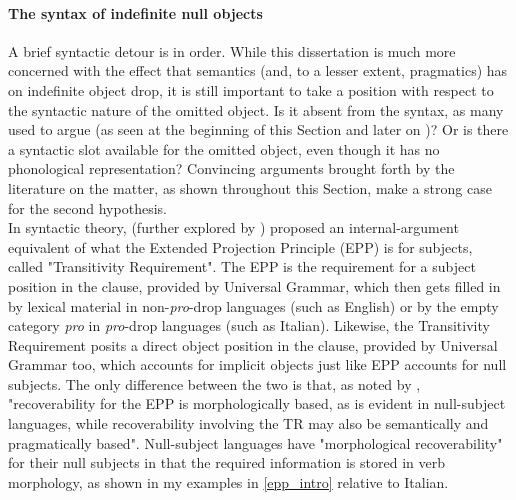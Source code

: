 \paragraph{The syntax of indefinite null objects} A brief syntactic detour is in order. While this dissertation is much more concerned with the effect that semantics (and, to a lesser extent, pragmatics) has on indefinite object drop, it is still important to take a position with respect to the syntactic nature of the omitted object. Is it absent from the syntax, as many used to argue (as seen at the beginning of this Section and later on )? Or is there a syntactic slot available for the omitted object, even though it has no phonological representation? Convincing arguments brought forth by the literature on the matter, as shown throughout this Section, make a strong case for the second hypothesis.\\
In syntactic theory, \textcite{roberge2002transitivity} (further explored by \textcite{CumminsRoberge2004, CumminsRoberge2005}) proposed an internal-argument equivalent of what the Extended Projection Principle (EPP) \parencite{chomsky1982epp} is for subjects, called "Transitivity Requirement". The EPP is the requirement for a subject position in the clause, provided by Universal Grammar, which then gets filled in by lexical material in non-\textit{pro}-drop languages (such as English) or by the empty category \textit{pro} in \textit{pro}-drop languages (such as Italian). Likewise, the Transitivity Requirement posits a direct object position in the clause, provided by Universal Grammar too, which accounts for implicit objects just like EPP accounts for null subjects. The only difference between the two is that, as noted by \textcite{CumminsRoberge2004}, "recoverability for the EPP is morphologically based, as is evident in null-subject languages, while recoverability involving the TR may also be semantically and pragmatically based". Null-subject languages have "morphological recoverability" for their null subjects in that the required information is stored in verb morphology, as shown in my examples in \ref{epp_intro} relative to Italian.

